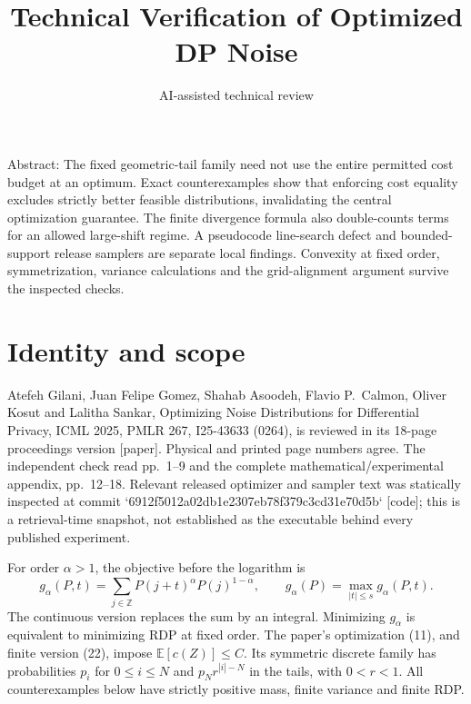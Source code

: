 \documentclass[10pt]{article}
\title{Technical Verification of Optimized DP Noise}
\author{AI-assisted technical review}
\date{}
\begin{document}
\maketitle
Abstract: The fixed geometric-tail family need not use the entire permitted cost budget at an optimum. Exact counterexamples show that enforcing cost equality excludes strictly better feasible distributions, invalidating the central optimization guarantee. The finite divergence formula also double-counts terms for an allowed large-shift regime. A pseudocode line-search defect and bounded-support release samplers are separate local findings. Convexity at fixed order, symmetrization, variance calculations and the grid-alignment argument survive the inspected checks.\par
\section*{Identity and scope}
Atefeh Gilani, Juan Felipe Gomez, Shahab Asoodeh, Flavio P. Calmon, Oliver Kosut and Lalitha Sankar, Optimizing Noise Distributions for Differential Privacy, ICML 2025, PMLR 267, I25-43633 (0264), is reviewed in its 18-page proceedings version [paper]. Physical and printed page numbers agree. The independent check read pp. 1–9 and the complete mathematical/experimental appendix, pp. 12–18. Relevant released optimizer and sampler text was statically inspected at commit `6912f5012a02db1e2307eb78f379c3cd31e70d5b` [code]; this is a retrieval-time snapshot, not established as the executable behind every published experiment.\par
For order \(\alpha>1\), the objective before the logarithm is \[g_\alpha(P,t)=\sum_{j\in\mathbb Z}P(j+t)^\alpha P(j)^{1-\alpha},
\qquad g_\alpha(P)=\max_{|t|\le s}g_\alpha(P,t).\] The continuous version replaces the sum by an integral. Minimizing \(g_\alpha\) is equivalent to minimizing RDP at fixed order. The paper’s optimization (11), and finite version (22), impose \(\mathbb E[c(Z)]\le C\). Its symmetric discrete family has probabilities \(p_i\) for \(0\le i\le N\) and \(p_Nr^{|i|-N}\) in the tails, with \(0<r<1\). All counterexamples below have strictly positive mass, finite variance and finite RDP.\par
\end{document}

